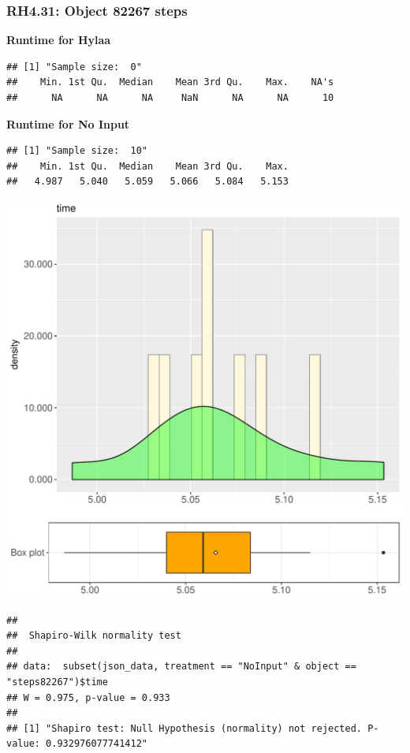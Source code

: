 \documentclass{article}\usepackage[]{graphicx}\usepackage[]{color}
\makeatletter
\def\maxwidth{ %
  \ifdim\Gin@nat@width>\linewidth
    \linewidth
  \else
    \Gin@nat@width
  \fi
}
\newenvironment{kframe}{%
 \def\at@end@of@kframe{}%
 \ifinner\ifhmode%
  \def\at@end@of@kframe{\end{minipage}}%
  \begin{minipage}{\columnwidth}%
 \fi\fi%
 \def\FrameCommand##1{\hskip\@totalleftmargin \hskip-\fboxsep
 \colorbox{shadecolor}{##1}\hskip-\fboxsep
     \hskip-\linewidth \hskip-\@totalleftmargin \hskip\columnwidth}%
 \MakeFramed {\advance\hsize-\width
   \@totalleftmargin\z@ \linewidth\hsize
   \@setminipage}}%
 {\par\unskip\endMakeFramed%
 \at@end@of@kframe}
\newenvironment{knitrout}{}{} %
\makeatother
\begin{document}
\subsubsection{RH4.31: Object 82267 steps}

 \textbf{Runtime for Hylaa}
\begin{knitrout}
\color{fgcolor}\begin{kframe}
\begin{verbatim}
## [1] "Sample size:  0"
##    Min. 1st Qu.  Median    Mean 3rd Qu.    Max.    NA's 
##      NA      NA      NA     NaN      NA      NA      10
\end{verbatim}
\end{kframe}
\end{knitrout}
 \textbf{Runtime for No Input}
\begin{knitrout}
\color{fgcolor}\begin{kframe}
\begin{verbatim}
## [1] "Sample size:  10"
##    Min. 1st Qu.  Median    Mean 3rd Qu.    Max. 
##   4.987   5.040   5.059   5.066   5.084   5.153
\end{verbatim}
\end{kframe}
\includegraphics[width=\maxwidth]{figure/RH4_NoInput_steps82267-1} 
\begin{kframe}\begin{verbatim}
## 
## 	Shapiro-Wilk normality test
## 
## data:  subset(json_data, treatment == "NoInput" & object == "steps82267")$time
## W = 0.975, p-value = 0.933
## 
## [1] "Shapiro test: Null Hypothesis (normality) not rejected. P-value: 0.932976077741412"
\end{verbatim}
\end{kframe}
\end{knitrout}
  
\end{document}
